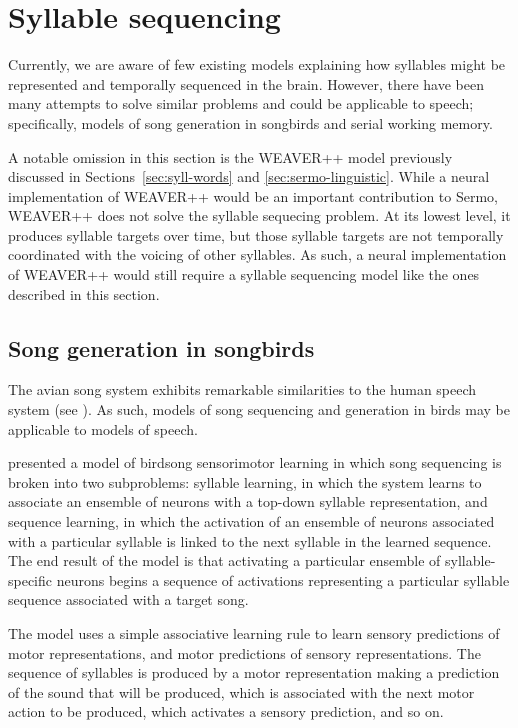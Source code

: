 \section{Syllable sequencing}

Currently,
we are aware of few existing models
explaining how syllables
might be represented
and temporally sequenced in the brain.
However, there have been many attempts
to solve similar problems
and could be applicable to speech;
specifically,
models of song generation in songbirds
and serial working memory.

A notable omission in this section
is the WEAVER++ model
previously discussed in
Sections~\ref{sec:syll-words}
and \ref{sec:sermo-linguistic}.
While a neural implementation of WEAVER++
would be an important contribution to Sermo,
WEAVER++ does not solve
the syllable sequecing problem.
At its lowest level,
it produces syllable targets over time,
but those syllable targets are not temporally
coordinated with the voicing of
other syllables.
As such, a neural implementation
of WEAVER++ would still require
a syllable sequencing model
like the ones described in this section.

\subsection{Song generation in songbirds}

The avian song system
exhibits remarkable similarities
to the human speech system
(see \citealt{bolhuis2010}).
As such, models of song sequencing
and generation in birds
may be applicable to models of speech.

\citet{troyer2000} presented a model
of birdsong sensorimotor learning
in which song sequencing is broken
into two subproblems:
syllable learning,
in which the system learns
to associate an ensemble of neurons
with a top-down syllable representation,
and sequence learning,
in which the activation
of an ensemble of neurons
associated with a particular syllable
is linked to the next syllable
in the learned sequence.
The end result of the model
is that activating a particular
ensemble of syllable-specific neurons
begins a sequence of activations
representing a particular syllable sequence
associated with a target song.

The model uses a
simple associative learning rule
to learn sensory predictions
of motor representations,
and motor predictions
of sensory representations.
The sequence of syllables is produced
by a motor representation
making a prediction of the
sound that will be produced,
which is associated with
the next motor action to be produced,
which activates a sensory prediction,
and so on.

